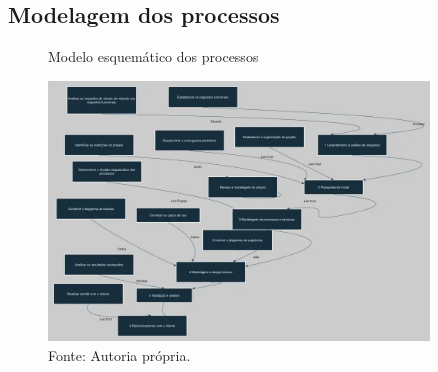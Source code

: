 

\subsection{Modelagem dos processos}

\begin{figure} [h!]	
    \centering

    \caption{Modelo esquemático dos processos}
    \includegraphics[width=0.9\textwidth]{Figures/Modelagem-dos-processos.jpg}
    \caption*{Fonte: Autoria própria.}
    \label{fig:Modelagem-dos-processos}
\end{figure}